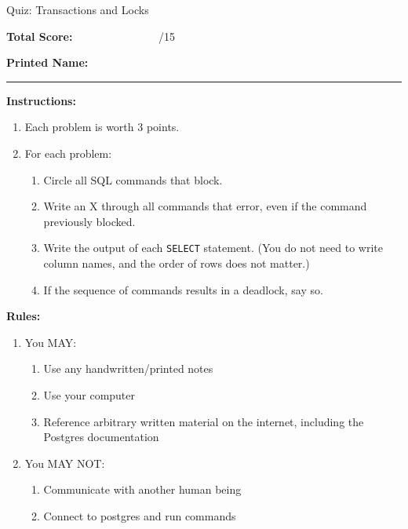 \documentclass[10pt]{article}
\theoremstyle{definition}
\begin{document}
\begin{center}
{
\Large
    Quiz: Transactions and Locks
}

    \vspace{0.1in}
\end{center}

\vspace{0.15in}
\noindent
\textbf{Total Score:} ~~~~~~~~~~~~~~~/15

\vspace{0.5in}
\noindent
\textbf{Printed Name:}

\noindent
\rule{\textwidth}{0.1pt}
\vspace{0.25in}

\noindent
\textbf{Instructions:}
\begin{enumerate}
    \item Each problem is worth 3 points.
    \item For each problem:
        \begin{enumerate}
        \item Circle all SQL commands that block.
        \item Write an X through all commands that error, even if the command previously blocked.
        \item Write the output of each \lstinline{SELECT} statement.
            (You do not need to write column names, and the order of rows does not matter.)
        \item If the sequence of commands results in a deadlock, say so.
        \end{enumerate}
\end{enumerate}

\vspace{0.2in}
\noindent
\textbf{Rules:}
\begin{enumerate}
    \item You MAY:
        \begin{enumerate}
            \item Use any handwritten/printed notes
            \item Use your computer
            \item Reference arbitrary written material on the internet, including the Postgres documentation
        \end{enumerate}
    \item You MAY NOT:
        \begin{enumerate}
            \item Communicate with another human being
            \item Connect to postgres and run commands
        \end{enumerate}
\end{enumerate}
\end{document}
